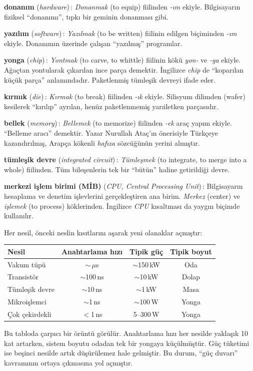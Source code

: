 \begin{terimnotu}
\textbf{donanım} (\emph{hardware})\,: \emph{Donanmak} (to equip) fiilinden \emph{-ım} ekiyle. Bilgisayarın fiziksel ``donanımı'', tıpkı bir geminin donanması gibi.

\textbf{yazılım} (\emph{software})\,: \emph{Yazılmak} (to be written) fiilinin edilgen biçiminden \emph{-ım} ekiyle. Donanımın üzerinde çalışan ``yazılmış'' programlar.

\textbf{yonga} (\emph{chip})\,: \emph{Yontmak} (to carve, to whittle) fiilinin kökü \emph{yon-} ve \emph{-ga} ekiyle. Ağaçtan yontularak çıkarılan ince parça demektir. İngilizce \emph{chip} de ``koparılan küçük parça'' anlamındadır. Paketlenmiş tümleşik devreyi ifade eder.

\textbf{kırmık} (\emph{die})\,: \emph{Kırmak} (to break) fiilinden \emph{-ık} ekiyle. Silisyum dilimden (wafer) kesilerek ``kırılıp'' ayrılan, henüz paketlenmemiş yarıiletken parçasıdır.

\textbf{bellek} (\emph{memory})\,: \emph{Bellemek} (to memorize) fiilinden \emph{-ek} araç yapım ekiyle. ``Belleme aracı'' demektir. Yazar Nurullah Ataç'ın önerisiyle Türkçeye kazandırılmış, Arapça kökenli \emph{hafıza} sözcüğünün yerini almıştır.

\textbf{tümleşik devre} (\emph{integrated circuit})\,: \emph{Tümleşmek} (to integrate, to merge into a whole) fiilinden. Tüm bileşenlerin tek bir ``bütün'' haline getirildiği devre.

\textbf{merkezi işlem birimi (MİB)} (\emph{CPU, Central Processing Unit})\,: Bilgisayarın hesaplama ve denetim işlevlerini gerçekleştiren ana birim. \emph{Merkez} (center) ve \emph{işlemek} (to process) köklerinden. İngilizce \emph{CPU} kısaltması da yaygın biçimde kullanılır.
\end{terimnotu}

\begin{karsilastirma}
Her nesil, önceki neslin kısıtlarını aşarak yeni olanaklar açmıştır:

\begin{center}
\small
\begin{tabular}{lccc}
\toprule
\textbf{Nesil} & \textbf{Anahtarlama hızı} & \textbf{Tipik güç} & \textbf{Tipik boyut} \\
\midrule
Vakum tüpü & $\sim$\,$\mu$s & $\sim$150\,kW & Oda \\
Transistör & $\sim$100\,ns & $\sim$10\,kW & Dolap \\
Tümleşik devre & $\sim$10\,ns & $\sim$1\,kW & Masa \\
Mikroişlemci & $\sim$1\,ns & $\sim$100\,W & Yonga \\
Çok çekirdekli & $<$1\,ns & 5--300\,W & Yonga \\
\bottomrule
\end{tabular}
\end{center}

Bu tabloda çarpıcı bir örüntü görülür. Anahtarlama hızı her nesilde yaklaşık 10 kat artarken, sistem boyutu odadan tek bir yongaya küçülmüştür. Güç tüketimi ise beşinci nesilde artık düşürülemez hale gelmiştir. Bu durum, ``güç duvarı'' kavramının ortaya çıkmasına yol açmıştır.
\end{karsilastirma}

